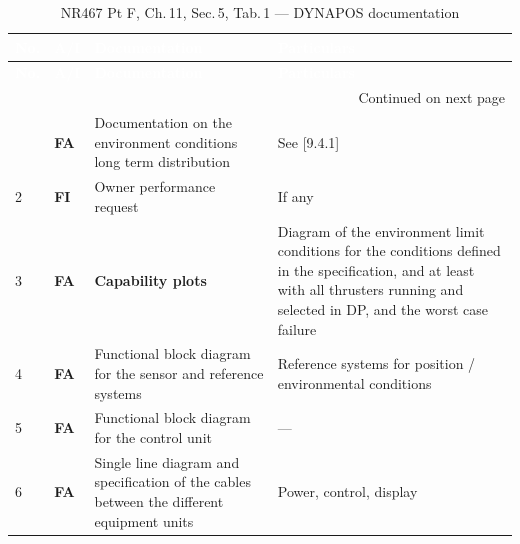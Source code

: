 \documentclass[11pt,a4paper]{report}
\newcommand{\fa}{\textbf{\textcolor{warningred}{FA}}}
\newcommand{\fic}{\textbf{\textcolor{bvgray}{FI}}}
\begin{document}
\vspace{2mm}
\noindent{}

\vspace{3mm}
\begin{longtable}{|p{0.7cm}|p{1.1cm}|p{5.8cm}|p{6.4cm}|}
\caption{NR467 Pt F, Ch.\,11, Sec.\,5, Tab.\,1 --- DYNAPOS documentation} \label{tab:dynapos} \\
\hline
\rowcolor{bvblue}
\textcolor{white}{\textbf{No.}} & \textcolor{white}{\textbf{A/I}} & \textcolor{white}{\textbf{Documentation}} & \textcolor{white}{\textbf{Particulars}} \\
\hline
\endfirsthead
\hline
\rowcolor{bvblue}
\textcolor{white}{\textbf{No.}} & \textcolor{white}{\textbf{A/I}} & \textcolor{white}{\textbf{Documentation}} & \textcolor{white}{\textbf{Particulars}} \\
\hline
\endhead
\hline \multicolumn{4}{|r|}{{Continued on next page}} \\ \hline
\endfoot
\hline
\endlastfoot
1 & \fa{} & Documentation on the environment conditions long term distribution & See [9.4.1] \\
\hline
2 & \fic{} & Owner performance request & If any \\
\hline
3 & \fa{} & \textbf{Capability plots} & Diagram of the environment limit conditions for the conditions defined in the specification, and at least with all thrusters running and selected in DP, and the worst case failure \\
\hline
4 & \fa{} & Functional block diagram for the sensor and reference systems & Reference systems for position / environmental conditions \\
\hline
5 & \fa{} & Functional block diagram for the control unit & --- \\
\hline
6 & \fa{} & Single line diagram and specification of the cables between the different equipment units & Power, control, display \\
\hline

\end{longtable}
\end{document}
